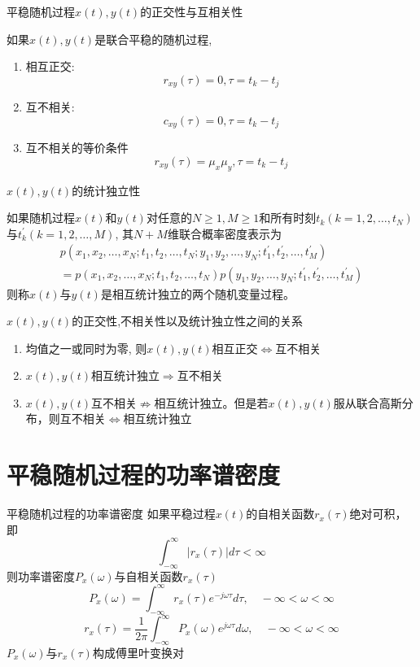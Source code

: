 \begin{frame}{平稳随机过程$x(t), y(t)$的正交性与互相关性}
\begin{definition}[]
	如果$x(t), y(t)$是联合平稳的随机过程,
	\begin{enumerate}
		\item 相互正交:
		\[r_{xy}(\tau)=0,\tau=t_k-t_j\]
		\item 互不相关:
		\[c_{xy}(\tau)=0,\tau=t_k-t_j\]
		\item
		互不相关的等价条件
		\[r_{xy}(\tau)=\mu_x\mu_y,\tau=t_k-t_j\]
	\end{enumerate}
\end{definition}
\end{frame}

\begin{frame}{$x(t), y(t)$的统计独立性}
\begin{definition}
	如果随机过程$x(t)$和$y(t)$对任意的$N\ge 1, M\ge 1$和所有时刻$t_k(k=1,2,\dots,t_N)$与$t_k^\prime(k=1,2,\dots,M)$, 其$N+M$维联合概率密度表示为
	\begin{align*}
	p(x_1,x_2,\dots,x_N; t_1,t_2,\dots,t_N; y_1,y_2,\dots,y_N; t_1^\prime,t_2^\prime,\dots,t_M^\prime)\\
	=p(x_1,x_2,\dots,x_N; t_1,t_2,\dots,t_N)p(y_1,y_2,\dots,y_N; t_1^\prime,t_2^\prime,\dots,t_M^\prime)
	\end{align*}
	则称$x(t)$与$y(t)$是相互统计独立的两个随机变量过程。
\end{definition}
\end{frame}

\begin{frame}{$x(t),y(t)$的正交性,不相关性以及统计独立性之间的关系}
\begin{enumerate}
	\item 均值之一或同时为零, 则$x(t), y(t)$相互正交$\Leftrightarrow$互不相关\\
	\item $x(t), y(t)$相互统计独立$\Rightarrow$互不相关
	\item $x(t), y(t)$互不相关$\nRightarrow$相互统计独立。但是若$x(t), y(t)$服从联合高斯分布，则互不相关$\Leftrightarrow$相互统计独立
\end{enumerate}
\end{frame}

\section{平稳随机过程的功率谱密度}

\begin{frame}{平稳随机过程的功率谱密度}
如果平稳过程$x(t)$的自相关函数$r_x(\tau)$绝对可积，即
$$\int_{-\infty}^{\infty}|r_x(\tau)|d\tau <\infty$$
则功率谱密度$P_x(\omega)$与自相关函数$r_x(\tau)$
$$P_x(\omega)=\int_{-\infty}^{\infty}r_x(\tau)e^{-j\omega\tau}d\tau,\quad -\infty<\omega<\infty$$
$$r_x(\tau)=\frac{1}{2\pi}\int_{-\infty}^{\infty}P_x(\omega)e^{j\omega\tau}d\omega,\quad -\infty<\omega<\infty$$
$P_x(\omega)$与$r_x(\tau)$构成傅里叶变换对
\end{frame}

